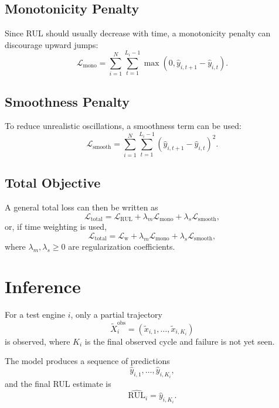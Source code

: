 \documentclass[11pt,a4paper]{article}
\begin{document}
\subsection{Monotonicity Penalty}
Since RUL should usually decrease with time, a monotonicity penalty can discourage upward jumps:
\begin{equation}
    \mathcal{L}_{\mathrm{mono}} =
    \sum_{i=1}^{N}\sum_{t=1}^{L_i-1}
    \max\left(0, \hat{y}_{i,t+1} - \hat{y}_{i,t}\right).
\end{equation}

\subsection{Smoothness Penalty}
To reduce unrealistic oscillations, a smoothness term can be used:
\begin{equation}
    \mathcal{L}_{\mathrm{smooth}} =
    \sum_{i=1}^{N}\sum_{t=1}^{L_i-1}
    \left(\hat{y}_{i,t+1} - \hat{y}_{i,t}\right)^2.
\end{equation}

\subsection{Total Objective}
A general total loss can then be written as
\begin{equation}
    \mathcal{L}_{\mathrm{total}} =
    \mathcal{L}_{\mathrm{RUL}}
    + \lambda_m \mathcal{L}_{\mathrm{mono}}
    + \lambda_s \mathcal{L}_{\mathrm{smooth}},
\end{equation}
or, if time weighting is used,
\begin{equation}
    \mathcal{L}_{\mathrm{total}} =
    \mathcal{L}_{\mathrm{w}}
    + \lambda_m \mathcal{L}_{\mathrm{mono}}
    + \lambda_s \mathcal{L}_{\mathrm{smooth}},
\end{equation}
where $\lambda_m,\lambda_s \geq 0$ are regularization coefficients.

\section{Inference}
For a test engine $i$, only a partial trajectory
\begin{equation}
    \tilde{X}_i^{\mathrm{obs}} =
    (\tilde{x}_{i,1},\dots,\tilde{x}_{i,K_i})
\end{equation}
is observed, where $K_i$ is the final observed cycle and failure is not yet seen.

The model produces a sequence of predictions
\begin{equation}
    \hat{y}_{i,1},\dots,\hat{y}_{i,K_i},
\end{equation}
and the final RUL estimate is
\begin{equation}
    \widehat{\mathrm{RUL}}_i = \hat{y}_{i,K_i}.
\end{equation}
\end{document}
